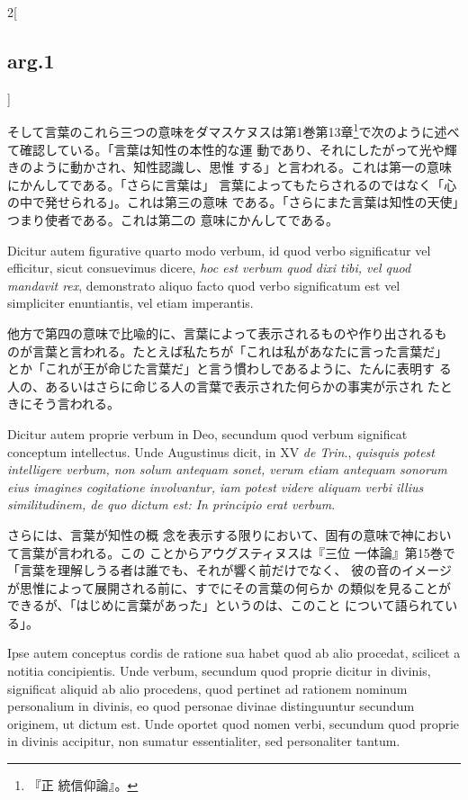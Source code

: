 \documentclass[paper=a4paper,fontsize=10pt,jafontsize=9pt,titlepage]{jlreq}
\begin{document}
\begin{paracol}{2}[\subsection{arg.1}]
\switchcolumn

そして言葉のこれら三つの意味をダマスケヌスは第1巻第13章\footnote{『正
 統信仰論』。}で次のように述べて確認している。「言葉は知性の本性的な運
 動であり、それにしたがって光や輝きのように動かされ、知性認識し、思惟
 する」と言われる。これは第一の意味にかんしてである。「さらに言葉は」
 言葉によってもたらされるのではなく「心の中で発せられる」。これは第三の意味
 である。「さらにまた言葉は知性の天使」つまり使者である。これは第二の
 意味にかんしてである。

\switchcolumn*

Dicitur autem figurative quarto modo verbum, id quod verbo
 significatur vel efficitur, sicut consuevimus dicere, {\itshape hoc est verbum
 quod dixi tibi, vel quod mandavit rex}, demonstrato aliquo facto quod
 verbo significatum est vel simpliciter enuntiantis, vel etiam
 imperantis.

\switchcolumn

他方で第四の意味で比喩的に、言葉によって表示されるものや作り出されるも
 のが言葉と言われる。たとえば私たちが「これは私があなたに言った言葉だ」
 とか「これが王が命じた言葉だ」と言う慣わしであるように、たんに表明す
 る人の、あるいはさらに命じる人の言葉で表示された何らかの事実が示され
 たときにそう言われる。

\switchcolumn*

Dicitur autem proprie verbum in Deo, secundum quod verbum
 significat conceptum intellectus. 
Unde Augustinus dicit, in XV {\itshape de
 Trin}., {\itshape quisquis potest intelligere verbum, non solum antequam sonet,
 verum etiam antequam sonorum eius imagines cogitatione involvantur,
 iam potest videre aliquam verbi illius similitudinem, de quo dictum
 est: In principio erat verbum}.

\switchcolumn

さらには、言葉が知性の概
 念を表示する限りにおいて、固有の意味で神において言葉が言われる。この
 ことからアウグスティヌスは『三位
 一体論』第15巻で「言葉を理解しうる者は誰でも、それが響く前だけでなく、
 彼の音のイメージが思惟によって展開される前に、すでにその言葉の何らか
 の類似を見ることができるが、「はじめに言葉があった」というのは、このこと
 について語られている」。

\switchcolumn*

Ipse autem conceptus cordis de ratione
 sua habet quod ab alio procedat, scilicet a notitia
 concipientis.
 Unde verbum, secundum quod proprie dicitur in divinis,
 significat aliquid ab alio procedens, quod pertinet ad rationem
 nominum personalium in divinis, eo quod personae divinae
 distinguuntur secundum originem, ut dictum est. Unde oportet quod
 nomen verbi, secundum quod proprie in divinis accipitur, non sumatur
 essentialiter, sed personaliter tantum.


\end{paracol}
\end{document}
